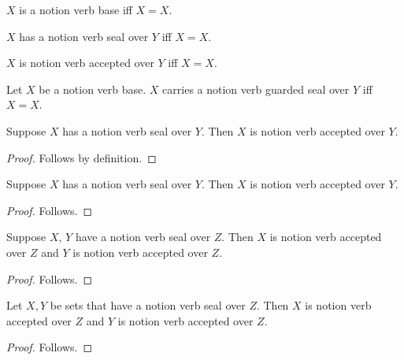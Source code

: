 \begin{definition}\label{notion_verb_base}
    $X$ is a notion verb base iff $X=X$.
\end{definition}

\begin{definition}\label{notion_verb_seal}
    $X$ has a notion verb seal over $Y$ iff $X=X$.
\end{definition}

\begin{definition}\label{notion_verb_accepted}
    $X$ is notion verb accepted over $Y$ iff $X=X$.
\end{definition}

\begin{definition}\label{notion_verb_guarded_seal}
    Let $X$ be a notion verb base.
    $X$ carries a notion verb guarded seal over $Y$ iff $X=X$.
\end{definition}

\begin{classification}\label{notion_verb_to_accepted}
    Suppose $X$ has a notion verb seal over $Y$.
    Then $X$ is notion verb accepted over $Y$.
\end{classification}
\begin{proof}
    Follows by definition.
\end{proof}

\begin{proposition}\label{notion_verb_direct}
    Suppose $X$ has a notion verb seal over $Y$.
    Then $X$ is notion verb accepted over $Y$.
\end{proposition}
\begin{proof}
    Follows.
\end{proof}

\begin{proposition}\label{notion_verb_plural}
    Suppose $X$, $Y$ have a notion verb seal over $Z$.
    Then $X$ is notion verb accepted over $Z$ and
        $Y$ is notion verb accepted over $Z$.
\end{proposition}
\begin{proof}
    Follows.
\end{proof}

\begin{proposition}\label{notion_verb_modifier}
    Let $X,Y$ be sets that have a notion verb seal over $Z$.
    Then $X$ is notion verb accepted over $Z$ and
        $Y$ is notion verb accepted over $Z$.
\end{proposition}
\begin{proof}
    Follows.
\end{proof}

